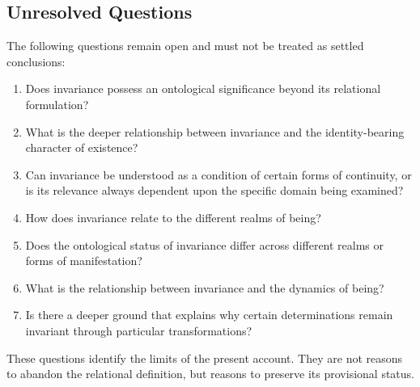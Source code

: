 \subsection*{Unresolved Questions}

The following questions remain
open and must not be treated
as settled conclusions:

\begin{enumerate}
    \item Does invariance possess
    an ontological significance
    beyond its relational
    formulation?

    \item What is the deeper
    relationship between
    invariance and the
    identity-bearing character
    of existence?

    \item Can invariance be
    understood as a condition
    of certain forms of
    continuity, or is its
    relevance always dependent
    upon the specific domain
    being examined?

    \item How does invariance
    relate to the different
    realms of being?

    \item Does the ontological
    status of invariance
    differ across different
    realms or forms of
    manifestation?

    \item What is the relationship
    between invariance and
    the dynamics of being?

    \item Is there a deeper
    ground that explains
    why certain determinations
    remain invariant through
    particular transformations?
\end{enumerate}

These questions identify the
limits of the present account.
They are not reasons to abandon
the relational definition,
but reasons to preserve its
provisional status.





